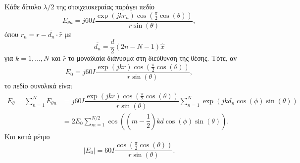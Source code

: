 \documentclass[12pt]{article}
\begin{document}
Κάθε δίπολο \(\lambda/2\) της στοιχειοκεραίας παράγει πεδίο 
\begin{equation*}
    E_{\theta n} = j60I\dfrac{\exp(jkr_n )\cos(\frac{\pi }{2 }\cos(\theta))}{r \sin(\theta)},
\end{equation*}
όπου \(r_n = r - \overline{d_n}\cdot \hat{r}\) με 
\begin{equation}
    \overline{d_n} = \dfrac{d }{2 }(2n - N - 1) \hat{x}
\end{equation}
για \(k = 1,\ldots, N\) και \(\hat{r }\) το μοναδιαία διάνυσμα στη διεύθυνση της θέσης. 
Τότε, αν \[E_0 = j60I\dfrac{\exp(jkr )\cos(\frac{\pi }{2 }\cos(\theta))}{r \sin(\theta)},\]το πεδίο συνολικά είναι 
\begin{align}
    E_\theta = \sum_{n = 1 }^{N } E_{\theta n} &= 
    j60I\dfrac{\exp(jkr )\cos(\frac{\pi }{2 }\cos(\theta))}{r \sin(\theta)}\sum_{n = 1}^{N } \exp(jkd_n\cos(\phi)\sin(\theta)) \\
    &= 2E_0\sum_{m = 1}^{N/2}\cos\left(\left(m-\dfrac{1}{2}\right)kd \cos(\phi)\sin(\theta)\right). 
\end{align}
Και κατά μέτρο
\begin{equation}
    |E_0| = 60I\dfrac{\cos(\frac{\pi }{2 }\cos(\theta ))}{r \sin(\theta)}.
\end{equation}
\end{document}
